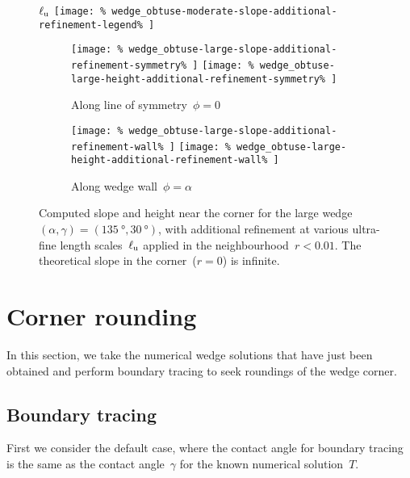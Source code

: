 \begin{figure}
  \newcommand*{\subfigurewidth}{0.45\textwidth}
  \centering
  $\ell_{\mathrm{u}}$
  \texttt{[image: \%
    wedge\_obtuse-moderate-slope-additional-refinement-legend\%
  ]}
  \hspace*{\fill}
  \begin{subfigure}[t]{\subfigurewidth}
    \texttt{[image: \%
      wedge\_obtuse-large-slope-additional-refinement-symmetry\%
    ]}
    \texttt{[image: \%
      wedge\_obtuse-large-height-additional-refinement-symmetry\%
    ]}
    \caption{%
      Along line of symmetry~$\phi = 0$
    }
    \label{fig:wedge_obtuse-large-additional-refinement-symmetry}
  \end{subfigure}
    \hfill
  \begin{subfigure}[t]{\subfigurewidth}
    \texttt{[image: \%
      wedge\_obtuse-large-slope-additional-refinement-wall\%
    ]}
    \texttt{[image: \%
      wedge\_obtuse-large-height-additional-refinement-wall\%
    ]}
    \caption{%
      Along wedge wall~$\phi = \alpha$
    }
    \label{fig:wedge_obtuse-large-additional-refinement-wall}
  \end{subfigure}
  \hspace*{\fill}
  \caption{
    Computed slope and height near the corner
    for the large wedge~%
      $(\alpha, \gamma) = (\SI{135}{\degree}, \SI{30}{\degree})$,
    with additional refinement
    at various ultra-fine length scales~$\ell_{\mathrm{u}}$
    applied in the neighbourhood~$r < 0.01$.
    The theoretical slope in the corner~($r = 0$) is infinite.
  }
  \label{fig:wedge_obtuse-large-additional-refinement}
\end{figure}

\section{Corner rounding}
\label{sec:re-entrant.rounding}

In this section,
we take the numerical wedge solutions that have just been obtained
and perform boundary tracing
to seek roundings of the wedge corner.

\subsection{Boundary tracing}
\label{sec:re-entrant.rounding.tracing}

First we consider the default case,
where the contact angle for boundary tracing
is the same as the contact angle~$\gamma$
for the known numerical solution~$T$.

